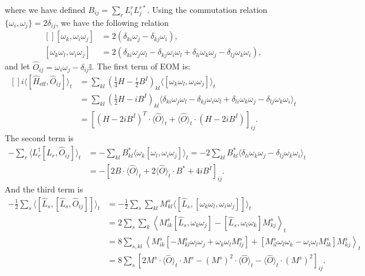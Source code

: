 \documentclass[aps,prb,superscriptaddress,nofootinbib]{revtex4}
\begin{document}
where we have defined $B_{ij} = \sum_r L^r_i L^{r*}_j$.
Using the commutation relation $\{\omega_i, \omega_j\} = 2\delta_{ij}$, we have the following relation
\begin{equation}
\begin{aligned}[]
	[\omega_k,\omega_i \omega_j] &= 2(\delta_{ki}\omega_j-\delta_{kj}\omega_i), \\
	[\omega_k \omega_l, \omega_i \omega_j] 
	&= 2(\delta_{ki}\omega_j \omega_l-\delta_{kj} \omega_i \omega_l + \delta_{li}\omega_k \omega_j - \delta_{lj}\omega_k\omega_i),
\end{aligned}
\end{equation}
and let $\hat O_{ij} = \omega_i\omega_j - \delta_{ij}\mathbb I$.
The first term of EOM is:
\begin{equation*}
\begin{aligned}[]
	i\langle[\hat H_{\mathrm{eff}}, \hat O_{ij}]\rangle_t
	&= \sum_{kl}\left(\frac{1}{4}H-\frac{i}{2}B^I \right)_{kl} \langle[\omega_k \omega_l, \omega_i \omega_j]\rangle_t \\
	&= \sum_{kl} \left(\frac{1}{2}H-i B^I\right)_{kl} \langle 
		\delta_{ki}\omega_j \omega_l-\delta_{kj} \omega_i \omega_l + 
		\delta_{li}\omega_k \omega_j - \delta_{lj}\omega_k\omega_i
	\rangle_t \\
	&= \left[
		(H-2iB^I)^T \cdot \langle\hat O\rangle_t + 
		\langle\hat O\rangle_t \cdot (H-2iB^I)
	\right]_{ij}.
\end{aligned}
\end{equation*}
The second term is
\begin{equation*}
\begin{aligned}
	-\sum_r \langle L_r^\dagger[L_r, \hat O_{ij}] \rangle_t
	&= -\sum_{kl} B_{kl}^* \langle \omega_k [\omega_l, \omega_i \omega_j] \rangle_t 
	= -2\sum_{kl} B_{kl}^* \langle 
		\delta_{li} \omega_k \omega_j - 
		\delta_{lj} \omega_k \omega_i
	\rangle_t \\
	&= -\left[2B\cdot \langle\hat O\rangle_t + 2\langle\hat O\rangle_t\cdot B^* + 4i B^I \right]_{ij}.
\end{aligned}
\end{equation*}
And the third term is
\begin{equation*}
\begin{aligned}
	-\frac{1}{2}\sum_s \langle[\hat L_s,[\hat L_s, \hat O_{ij}]]\rangle_t
	&= -\frac{1}{2} \sum_s \sum_{kl} M^s_{kl}\langle[\hat L_s,[\omega_k \omega_l, \omega_i \omega_j]]\rangle_t \\
	&= 2\sum_s \sum_{k} \left\langle M^s_{ik}[\hat L_s,\omega_k \omega_j]-[\hat L_s,\omega_i \omega_k]M^s_{kj} \right\rangle_t \\
	&= 8\sum_{s,kl} \left\langle M^s_{ik}[-M^s_{kl}\omega_l\omega_j+\omega_k\omega_l M^s_{lj}]+[M^s_{il}\omega_l\omega_k-\omega_i\omega_l M^s_{lk}]M^s_{kj} \right\rangle_t \\
	&= 8\sum_s \left[2 M^s \cdot \langle\hat O\rangle_t\cdot M^s-(M^s)^2 \cdot \langle\hat O\rangle_t - \langle\hat O\rangle_t\cdot(M^s)^2 \right]_{ij}.
\end{aligned}
\end{equation*}
\end{document}
